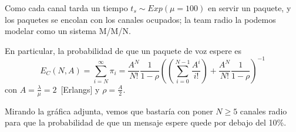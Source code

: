\documentclass{upmassignment}
\begin{document}
\begin{problemlist}
\begin{solucion}
Como cada canal tarda un tiempo
$t_s\sim Exp(\mu=100)$ en servir un paquete,
y los paquetes se encolan con los canales
ocupados; la team radio la podemos modelar
como un sistema M/M/N.

En particular, la probabilidad de que un paquete
de voz espere es
\begin{equation*}
    E_C(N,A)=\sum_{i=N}^\infty \pi_i
    = \frac{A^N}{N!}\frac{1}{1-\rho}
    \left(
        \left(\sum_{i=0}^{N-1}
        \frac{A^i}{i!}
        \right)
        + \frac{A^N}{N!}\frac{1}{1-\rho}
    \right)^{-1}
\end{equation*}
con $A=\tfrac{\lambda}{\mu}=2$~[Erlangs]
y $\rho=\tfrac{A}{2}$.

Mirando la gráfica adjunta, vemos que bastaría
con poner $N\geq5$ canales radio para que
la probabilidad de que un mensaje espere quede
por debajo del 10\%.


    \end{solucion}
\end{problemlist}
\end{document}
